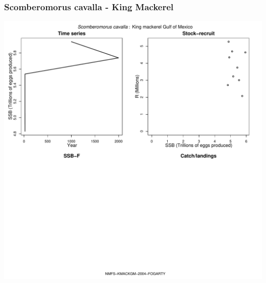 \subsubsection{Scomberomorus cavalla - King Mackerel}
\begin{center}
\includegraphics[width=1.2\textwidth]{../R/figures/NMFS-KMACKGM-2004-FOGARTY.pdf}
\end{center}

